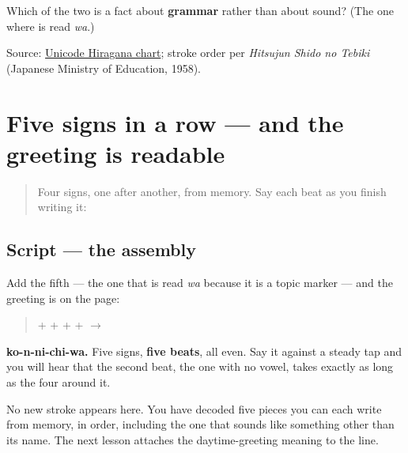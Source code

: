 \begin{tcolorbox}[breakable,colback=teal!4,colframe=teal!35!black,title={Before you move on}]
Which of the two is a fact about \textbf{grammar} rather than about sound? (The one where  is read \emph{wa}.)

Source: \href{https://www.unicode.org/charts/PDF/U3040.pdf}{Unicode Hiragana chart}; stroke order per \emph{Hitsujun Shido no Tebiki} (Japanese Ministry of Education, 1958).
\end{tcolorbox}
\section[\texorpdfstring{\ja{こんにちは} (konnichiwa)}{こんにちは (konnichiwa)}]{Five signs in a row — and the greeting is readable}

\label{lesson:JA-W01-konnichiwa-read}



\begin{quote}
Four signs, one after another, from memory. Say each beat as you finish writing it:

\begin{quote}
         
\end{quote}
\end{quote}

\subsection*{Script — the assembly}

Add the fifth — the one that is read \emph{wa} because it is a topic marker — and the greeting is on the page:

\begin{quote}
\textbf{} + \textbf{} + \textbf{} + \textbf{} + \textbf{} $\to$ \textbf{}
\end{quote}

\textbf{ko-n-ni-chi-wa.} Five signs, \textbf{five beats}, all even. Say it against a steady tap and you will hear that the second beat, the one with no vowel, takes exactly as long as the four around it.

No new stroke appears here. You have decoded five pieces you can each write from memory, in order, including the one that sounds like something other than its name. The next lesson attaches the daytime-greeting meaning to the line.

